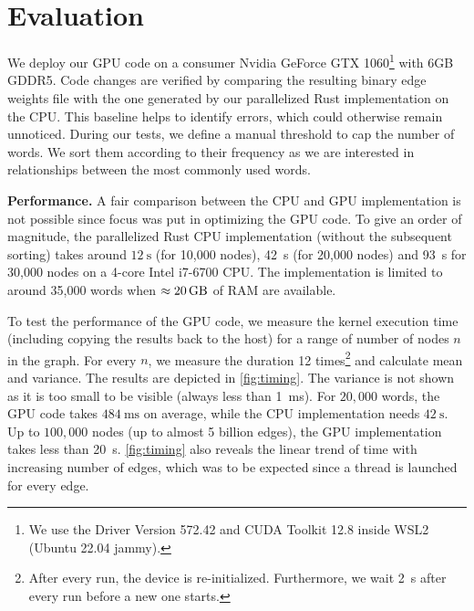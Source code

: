 \section{Evaluation}
\label{sec:eval}

We deploy our GPU code on a consumer Nvidia GeForce GTX 1060\footnote{We use the Driver Version 572.42 and CUDA Toolkit 12.8 inside WSL2 (Ubuntu 22.04 jammy).} with 6GB GDDR5. Code changes are verified by comparing the resulting binary edge weights file with the one generated by our parallelized Rust implementation on the CPU. This baseline helps to identify errors, which could otherwise remain unnoticed. During our tests, we define a manual threshold to cap the number of words. We sort them according to their frequency as we are interested in relationships between the most commonly used words.

\vspace{-0.2em}

\textbf{Performance.} A fair comparison between the CPU and GPU implementation is not possible since focus was put in optimizing the GPU code. To give an order of magnitude, the parallelized Rust CPU implementation (without the subsequent sorting) takes around $\qty{12}{\s}$ (for 10,000 nodes), \qty{42}{\s} (for 20,000 nodes) and \qty{93}{\s} for 30,000 nodes on a 4-core Intel i7-6700 CPU. The implementation is limited to around 35,000 words when $\approx\qty{20}{\giga\byte}$ of RAM are available.

To test the performance of the GPU code, we measure the kernel execution time (including copying the results back to the host) for a range of number of nodes $n$ in the graph. For every $n$, we measure the duration 12 times\footnote{After every run, the device is re-initialized. Furthermore, we wait \qty{2}{\s} after every run before a new one starts.} and calculate mean and variance. The results are depicted in \autoref{fig:timing}. The variance is not shown as it is too small to be visible (always less than \qty{1}{\ms}). For $20,000$ words, the GPU code takes $\qty{484}{\ms}$ on average, while the CPU implementation needs $\qty{42}{\s}$. Up to $100,000$ nodes (\ie up to almost 5 billion edges), the GPU implementation takes less than \qty{20}{\s}. \autoref{fig:timing} also reveals the linear trend of time with increasing number of edges, which was to be expected since a thread is launched for every edge.

\vspace{-0.37cm}

